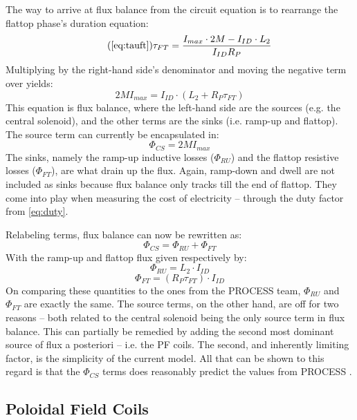 The way to arrive at flux balance from the circuit equation is to rearrange the flattop phase's duration equation:
\begin{equation}
	\tag{\ref{eq:tauft}}
	\tau_{FT} = \frac{ I_{max} \cdot 2 M - I_{ID} \cdot  L_2 }{I_{ID} R_P}
\end{equation}
Multiplying by the right-hand side's denominator and moving the negative term over yields:
\begin{equation}
	2 M I_{max} = I_{ID} \cdot \left( L_2 + R_P \tau_{FT} \right) 
\end{equation}
This equation is flux balance, where the left-hand side are the sources (e.g. the central solenoid), and the other terms are the sinks (i.e. ramp-up and flattop). The source term can currently be encapsulated in:
\begin{equation}
	\label{eq:phics}
	\Phi_{CS} = 2 M I_{max}
\end{equation}
The sinks, namely the ramp-up inductive losses ($\Phi_{RU}$) and the flattop resistive losses ($\Phi_{FT}$), are what drain up the flux. Again, ramp-down and dwell are not included as sinks because flux balance only tracks till the end of flattop. They come into play when measuring the cost of electricity -- through the duty factor from \cref{eq:duty}.

Relabeling terms, flux balance can now be rewritten as:
\begin{equation}
	\Phi_{CS} = \Phi_{RU} + \Phi_{FT}
\end{equation}
With the ramp-up and flattop flux given respectively by:
\begin{equation}
	\label{eq:phiru}
	\Phi_{RU} = L_2 \cdot I_{ID}
\end{equation}
\begin{equation}
	\label{eq:phift}
	\Phi_{FT} = ( R_P \tau_{FT} ) \cdot I_{ID}
\end{equation}
On comparing these quantities to the ones from the PROCESS team, $\Phi_{RU}$ and $\Phi_{FT}$ are exactly the same. The source terms, on the other hand, are off for two reasons -- both related to the central solenoid being the only source term in flux balance. This can partially be remedied by adding the second most dominant source of flux a posteriori -- i.e. the PF coils. The second, and inherently limiting factor, is the simplicity of the current model. All that can be shown to this regard is that the $\Phi_{CS}$ terms does reasonably predict the values from  PROCESS .

\subsection{ Poloidal Field Coils}

